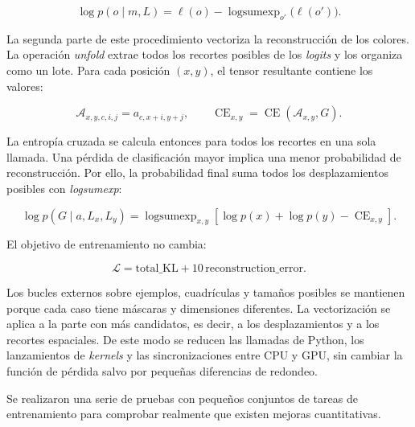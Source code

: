 \documentclass[11pt,a4paper,spanish]{book}
\numberwithin{equation}{chapter}
\numberwithin{figure}{chapter}
\begin{document}
\begin{equation}
\log p(o\mid m,L)=\ell(o)-\operatorname{logsumexp}_{o'}\bigl(\ell(o')\bigr).
\label{eq:h1-particion-desplazamiento}
\end{equation}

La segunda parte de este procedimiento vectoriza la reconstrucción de los colores. La operación \textit{unfold} extrae todos los recortes posibles de
los \textit{logits} y los organiza como un lote. Para cada posición $(x,y)$, el tensor resultante contiene los valores:

\begin{equation}
\mathcal{A}_{x,y,c,i,j}=a_{c,x+i,y+j},
\qquad
\operatorname{CE}_{x,y}=\operatorname{CE}(\mathcal{A}_{x,y},G).
\label{eq:h1-unfold}
\end{equation}

La entropía cruzada se calcula entonces para todos los recortes en una sola llamada. Una pérdida de clasificación mayor implica una menor
probabilidad de reconstrucción. Por ello, la probabilidad final suma todos los desplazamientos posibles con \textit{logsumexp}:

\begin{equation}
\log p(G\mid a,L_x,L_y)=\operatorname{logsumexp}_{x,y}\left[
\log p(x)+\log p(y)-\operatorname{CE}_{x,y}\right].
\label{eq:h1-marginalizacion}
\end{equation}

El objetivo de entrenamiento no cambia:

\begin{equation}
\mathcal{L}=\mathrm{total\_KL}+10\,\mathrm{reconstruction\_error}.
\label{eq:h1-objetivo-global}
\end{equation}

Los bucles externos sobre ejemplos, cuadrículas y tamaños posibles se mantienen porque cada caso tiene máscaras y dimensiones
diferentes. La vectorización se aplica a la parte con más candidatos, es decir, a los desplazamientos y a los recortes espaciales. De
este modo se reducen las llamadas de Python, los lanzamientos de \textit{kernels} y las sincronizaciones entre CPU y GPU, sin cambiar
la función de pérdida salvo por pequeñas diferencias de redondeo.

Se realizaron una serie de pruebas con pequeños conjuntos de tareas de entrenamiento para comprobar realmente que existen mejoras cuantitativas.
\end{document}
